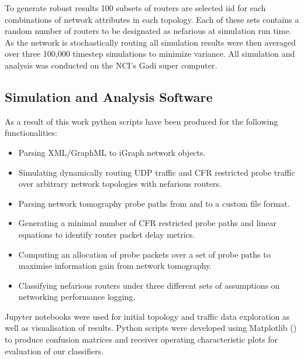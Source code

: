 To generate robust results 100 subsets of routers are selected iid for each combinations of network attributes in each topology. Each of these sets contains a random number of routers to be designated as nefarious at simulation run time. As the network is stochastically routing all simulation results were then averaged over three 100,000 timestep simulations to minimize variance. All simulation and analysis was conducted on the NCI's Gadi super computer.\par

\subsection{Simulation and Analysis Software}
\label{ssec:Msoftware}
As a result of this work python scripts have been produced for the following functionalities:
\begin{itemize}
    \item Parsing XML/GraphML to iGraph network objects.
    \item Simulating dynamically routing UDP traffic and CFR restricted probe traffic over arbitrary network topologies with nefarious routers.
    \item Parsing network tomography probe paths from and to a custom file format.
    \item Generating a minimal number of CFR restricted probe paths and linear equations to identify router packet delay metrics.
    \item Computing an allocation of probe packets over a set of probe paths to maximise information gain from network tomography.
    \item Classifying nefarious routers under three different sets of assumptions on networking performance logging.
\end{itemize}
Jupyter notebooks were used for initial topology and traffic data exploration as well as visualisation of results. Python scripts were developed using Matplotlib (\cite{hunter_matplotlib_2007}) to produce confusion matrices and receiver operating characteristic plots for evaluation of our classifiers.

